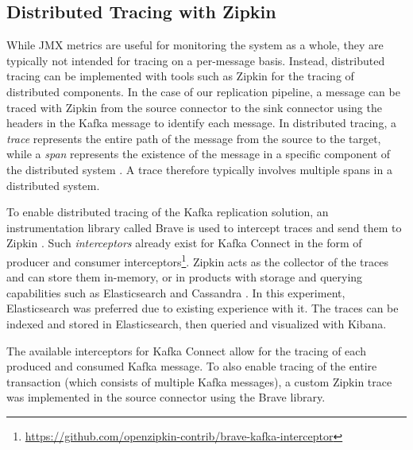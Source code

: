 
\subsection{Distributed Tracing with Zipkin}
While \ac{JMX} metrics are useful for monitoring the system as a whole, they are typically not intended for tracing on a per-message basis. Instead, distributed tracing can be implemented with tools such as Zipkin for the tracing of distributed components. In the case of our replication pipeline, a message can be traced with Zipkin from the source connector to the sink connector using the headers in the Kafka message to identify each message. In distributed tracing, a \textit{trace} represents the entire path of the message from the source to the target, while a \textit{span} represents the existence of the message in a specific component of the distributed system \cite{janes2022zipkin}. A trace therefore typically involves multiple spans in a distributed system.

To enable distributed tracing of the Kafka replication solution, an instrumentation library called Brave is used to intercept traces and send them to Zipkin \cite{mallanna2020distributedzipkin}. Such \textit{interceptors} already exist for Kafka Connect in the form of producer and consumer interceptors\footnote{\url{https://github.com/openzipkin-contrib/brave-kafka-interceptor}}. 
Zipkin acts as the collector of the traces and can store them in-memory, or in products with storage and querying capabilities such as Elasticsearch and Cassandra \cite{mallanna2020distributedzipkin}. In this experiment, Elasticsearch was preferred due to existing experience with it. The traces can be indexed and stored in Elasticsearch, then queried and visualized with Kibana. %

The available interceptors for Kafka Connect allow for the tracing of each produced and consumed Kafka message. To also enable tracing of the entire transaction (which consists of multiple Kafka messages), a custom Zipkin trace was implemented in the source connector using the Brave library.





